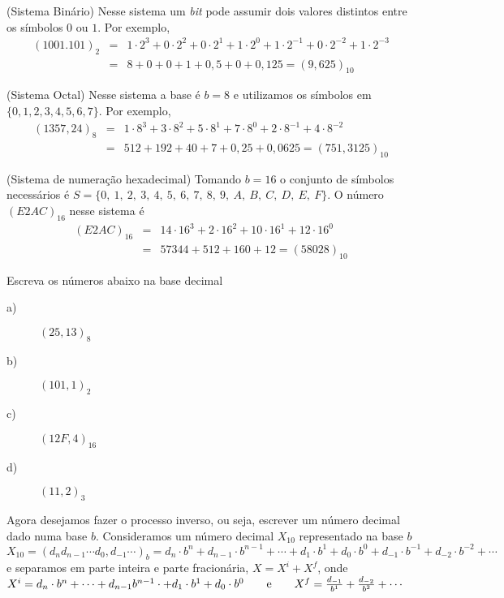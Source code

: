 
\begin{ex} (Sistema Binário)
Nesse sistema um \textit{bit} pode assumir dois valores distintos entre os símbolos $0$ ou $1$. Por exemplo,
\begin{eqnarray*}
(1001.101)_{2}&=&1\cdot 2^3 +0\cdot 2^2 +0\cdot 2^1 +1\cdot 2^0  +1\cdot 2^{-1} +0\cdot 2^{-2} +1\cdot 2^{-3} \\ &=&8+0+0+1+ 0,5+0+0,125=(9,625)_{10}
\end{eqnarray*}
\end{ex}

\begin{ex} (Sistema Octal)
Nesse sistema a base é $b=8$ e utilizamos os símbolos em $\{0, 1, 2, 3, 4, 5, 6, 7\}$. Por exemplo,
\begin{eqnarray*}
(1357,24)_{8}&=&1\cdot 8^3+3\cdot 8^2+5\cdot 8^1+7\cdot 8^{0}+2\cdot 8^{-1}+4\cdot 8^{-2}\\&=&512+192+40+7+0,25+0,0625=(751,3125)_{10}
\end{eqnarray*}
\end{ex}


\begin{ex} (Sistema de numeração hexadecimal) Tomando $b=16$  o conjunto de símbolos necessários é  $S=\{0,\ 1,\ 2,\ 3,\ 4,\ 5,\ 6,\ 7,\ 8,\ 9,\ A,\ B,\ C,\ D,\ E,\ F\}$. O número $(E2AC)_{16}$ nesse sistema é
\begin{eqnarray*}
(E2AC)_{16}&=&14\cdot 16^3+2\cdot 16^2+10\cdot 16^1+12\cdot 16^{0}\\&=&57344+512+160+12=(58028)_{10}
\end{eqnarray*}
\end{ex}

\begin{prob}Escreva os números abaixo na base decimal
\begin{description}
\item[a)] $(25,13)_8$
\item[b)] $(101,1)_2$
\item[c)] $(12F,4)_{16}$
\item[d)] $(11,2)_{3}$
\end{description}
\end{prob}

Agora desejamos fazer o processo inverso, ou seja, escrever um número decimal dado numa base $b$. Consideramos um número decimal $X_{10}$ representado na base $b$
$
X_{10}=(d_nd_{n-1}\cdots d_0,d_{-1}\cdots)_{b}=d_n\cdot b^{n}+d_{n-1}\cdot b^{n-1}+\cdots +d_1\cdot b^1+d_0\cdot b^0+d_{-1}\cdot b^{-1}+d_{-2}\cdot b^{-2}+\cdots
$
e separamos em parte inteira e parte fracionária, $X=X^{i}+X^{f}$, onde
$
X^{i}=d_n\cdot b^{n}+ \cdots+d_{n-1}b^{n-1} \cdot  +d_1\cdot b^1 +d_0\cdot b^0 \qquad \hbox{e}\qquad X^{f}
= \frac{d_{-1}}{b^1}+\frac{d_{-2}}{b^{2}}+\cdots
$


